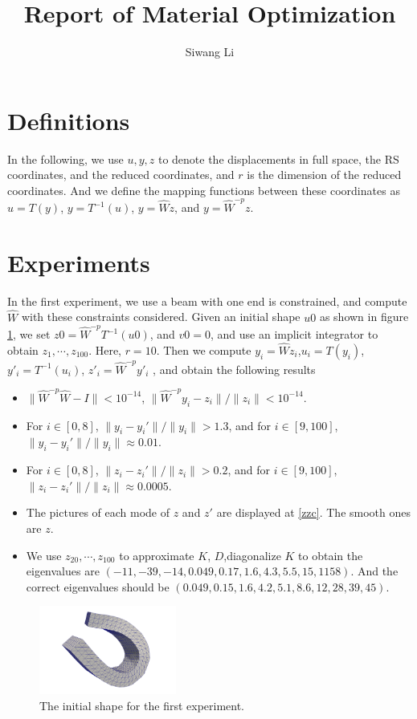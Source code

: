 \documentclass[twocolumn,a4paper]{article}
\author{Siwang Li}
\title{Report of Material Optimization}
\begin{document}
\maketitle

\section{Definitions}
In the following, we use $u,y,z$ to denote the displacements in full space, the
RS coordinates, and the reduced coordinates, and $r$ is the dimension of the
reduced coordinates. And we define the mapping functions between these
coordinates as $u=T(y)$, $y=T^{-1}(u)$, $y=\hat{W}z$, and $y=\hat{W}^{-p}z$.
\section{Experiments}
In the first experiment, we use a beam with one end is constrained, and compute
$\hat{W}$ with these constraints considered. Given an initial shape $u0$ as
shown in figure \ref{input1}, we set $z0=\hat{W}^{-p}T^{-1}(u0)$, and $v0=0$, and
use an implicit integrator to obtain $z_1,\cdots,z_{100}$. Here, $r=10$. Then we
compute $y_i=\hat{W}z_i$,$u_i=T(y_i)$, $y'_i=T^{-1}(u_i)$,
$z'_i=\hat{W}^{-p}y'_i$ , and obtain the following results
\begin{itemize}
\item $\|\hat{W}^{-p}\hat{W}-I\| < 10^{-14}$, $\|\hat{W}^{-p}y_i-z_i\|/\|z_i\| <
  10^{-14}$.
\item For $i\in[0,8]$, $\|y_i-y_i'\|/\|y_i\|>1.3$, and for $i\in[9,100]$,
  $\|y_i-y_i'\|/\|y_i\|\approx 0.01$.
\item For $i\in[0,8]$, $\|z_i-z_i'\|/\|z_i\|>0.2$, and for $i\in[9,100]$,
  $\|z_i-z_i'\|/\|z_i\|\approx 0.0005$.
\item The pictures of each mode of $z$ and $z'$ are displayed at \ref{zzc}. The
  smooth ones are $z$.
\item We use $z_{20},\cdots,z_{100}$ to approximate $K$, $D$,diagonalize $K$ to
  obtain the eigenvalues are $(-11, -39, -14, 0.049, 0.17, 1.6, 4.3, 5.5, 15,
  1158)$. And the correct eigenvalues should be $(0.049, 0.15, 1.6, 4.2, 5.1,
  8.6, 12, 28,39, 45)$.
\end{itemize}
\begin{figure}
  \centering
  \includegraphics[width=0.4\textwidth]{./figures/rscon_input.png}
  \caption{The initial shape for the first experiment.}
  \label{input1}
\end{figure}
\end{document}
